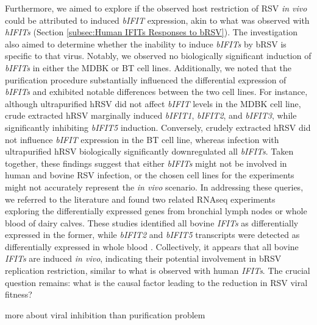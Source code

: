 Furthermore, we aimed to explore if the observed host restriction of RSV \textit{in vivo} could be attributed to induced \textit{bIFIT} expression, akin to what was observed with \textit{hIFITs} (Section \ref{subsec:Human IFITs Responses to bRSV}). The investigation also aimed to determine whether the inability to induce \textit{bIFITs} by bRSV is specific to that virus. Notably, we observed no biologically significant induction of \textit{bIFITs} in either the MDBK or BT cell lines. Additionally, we noted that the purification procedure substantially influenced the differential expression of \textit{bIFITs} and exhibited notable differences between the two cell lines. For instance, although ultrapurified hRSV did not affect \textit{bIFIT} levels in the MDBK cell line, crude extracted hRSV marginally induced \textit{bIFIT1}, \textit{bIFIT2}, and \textit{bIFIT3}, while significantly inhibiting \textit{bIFIT5} induction. Conversely, crudely extracted hRSV did not influence \textit{bIFIT} expression in the BT cell line, whereas infection with ultrapurified hRSV biologically significantly downregulated all \textit{bIFITs}. Taken together, these findings suggest that either \textit{bIFITs} might not be involved in human and bovine RSV infection, or the chosen cell lines for the experiments might not accurately represent the \textit{in vivo} scenario. In addressing these queries, we referred to the literature and found two related RNAseq experiments exploring the differentially expressed genes from bronchial lymph nodes or whole blood of dairy calves. These studies identified all bovine \textit{IFITs} as differentially expressed in the former, while \textit{bIFIT2} and \textit{bIFIT5} transcripts were detected as differentially expressed in whole blood \cite{Johnston2019ExperimentalResponse., Johnston2021MessengerCalves}. Collectively, it appears that all bovine \textit{IFITs} are induced \textit{in vivo}, indicating their potential involvement in bRSV replication restriction, similar to what is observed with human \textit{IFITs}. The crucial question remains: what is the causal factor leading to the reduction in RSV viral fitness?





more about viral inhibition than purification problem









